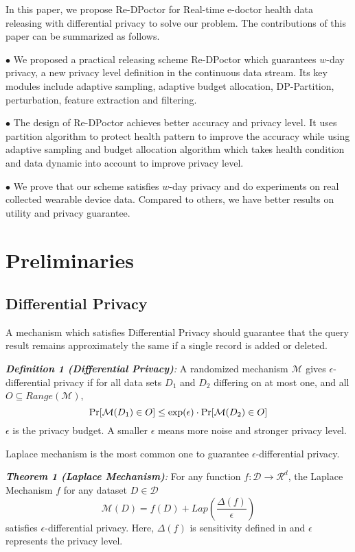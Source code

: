 \documentclass[10pt,conference]{IEEEtran}
\begin{document}
In this paper, we propose Re-DPoctor for Real-time e-doctor health data releasing with differential privacy to solve our problem. The contributions of this paper can be summarized as follows.

$\bullet$ We proposed a practical releasing scheme Re-DPoctor which guarantees $w$-day privacy, a new privacy level deﬁnition in the continuous data stream. Its key modules include adaptive sampling, adaptive budget allocation, DP-Partition, perturbation, feature extraction and ﬁltering.
 	
$\bullet$ The design of Re-DPoctor achieves better accuracy and privacy level. It uses partition algorithm to protect health pattern to improve the accuracy while using adaptive sampling and budget allocation algorithm which takes health condition and data dynamic into account to improve privacy level.
 	
$\bullet$ We prove that our scheme satisﬁes $w$-day privacy and do experiments on real collected wearable device data. Compared to others, we have better results on utility and privacy guarantee.

\section{Preliminaries}

\subsection{Differential Privacy}
A mechanism which satisfies Differential Privacy should guarantee that the query result remains approximately the same if a single record is added or deleted.

\emph{\textbf{Definition 1 (Differential Privacy\cite{Dwork2006Differential})}:} A randomized mechanism $\mathcal{M}$ gives $\epsilon$-differential privacy if for all data sets $D_1$ and $D_2$ differing on at most one, and all   $O \subseteq Range(\mathcal{M})$,
\begin{equation}\label{1}
{\rm Pr}[\mathcal{M}(D_1)\in O]\leq {\rm exp}(\epsilon)\cdot {\rm Pr}[\mathcal{M}(D_2)\in O]
\end{equation}
$\epsilon$ is the privacy budget. A smaller $\epsilon$ means more noise and stronger privacy level.

Laplace mechanism is the most common one to guarantee $\epsilon$-differential privacy.

\emph{\textbf{Theorem 1 (Laplace Mechanism\cite{Dwork2006Calibrating})}:} For any function $f:\mathcal{D} \rightarrow \mathcal{R}^{d}$, the Laplace Mechanism $f$ for any dataset $D\in\mathcal{D}$  
\begin{equation}\label{3}
\mathcal{M}(D) = f(D) + Lap(\frac{\Delta(f)}{\epsilon})
\end{equation}
satisfies $\epsilon$-differential privacy. Here, $\Delta(f)$ is sensitivity defined in\cite{Dwork2006Calibrating} and $\epsilon$ represents the privacy level.
\end{document}
